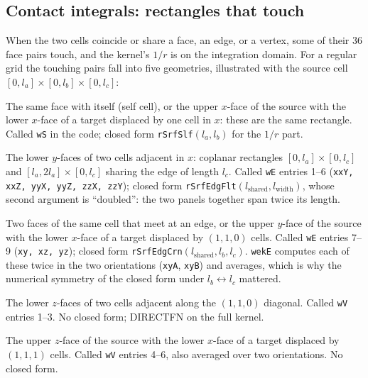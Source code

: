 \documentclass[11pt]{article}
\theoremstyle{remark}
\newcommand{\code}[1]{\texttt{#1}}
\begin{document}
\subsection{Contact integrals: rectangles that touch}
\label{sec:contact}

When the two cells coincide or share a face, an edge, or a vertex, some of their 36
face pairs touch, and the kernel's $1/r$ is on the integration domain. For a regular
grid the touching pairs fall into five geometries, illustrated with the source cell
$[0,l_a]\times[0,l_b]\times[0,l_c]$:
\begin{description}[nosep,leftmargin=1.5em]
\item[Self (coincident faces).] The same face with itself (self cell), or the upper
$x$-face of the source with the lower $x$-face of a target displaced by one cell in
$x$: these are the same rectangle. Called \code{wS} in the code; closed form
\code{rSrfSlf}$(l_a,l_b)$ for the $1/r$ part.
\item[Flat edge (coplanar, sharing an edge).] The lower $y$-faces of two cells
adjacent in $x$: coplanar rectangles $[0,l_a]\times[0,l_c]$ and
$[l_a,2l_a]\times[0,l_c]$ sharing the edge of length $l_c$. Called \code{wE} entries
1--6 (\code{xxY, xxZ, yyX, yyZ, zzX, zzY}); closed form
\code{rSrfEdgFlt}$(l_{\text{shared}}, l_{\text{width}})$, whose second argument is
``doubled'': the two panels together span twice its length.
\item[Cornered edge (perpendicular, sharing an edge).] Two faces of the same cell
that meet at an edge, or the upper $y$-face of the source with the lower $x$-face of a
target displaced by $(1,1,0)$ cells. Called \code{wE} entries 7--9 (\code{xy, xz,
yz}); closed form \code{rSrfEdgCrn}$(l_{\text{shared}}, l_b, l_c)$. \code{wekE}
computes each of these twice in the two orientations (\code{xyA}, \code{xyB}) and
averages, which is why the numerical symmetry of the closed form under $l_b
\leftrightarrow l_c$ mattered.
\item[Coplanar vertex (coplanar, sharing a corner).] The lower $z$-faces of two
cells adjacent along the $(1,1,0)$ diagonal. Called \code{wV} entries 1--3. No closed
form; DIRECTFN on the full kernel.
\item[Perpendicular vertex (perpendicular planes, sharing a corner).] The upper
$z$-face of the source with the lower $x$-face of a target displaced by $(1,1,1)$
cells. Called \code{wV} entries 4--6, also averaged over two orientations. No closed
form.
\end{description}
\end{document}
